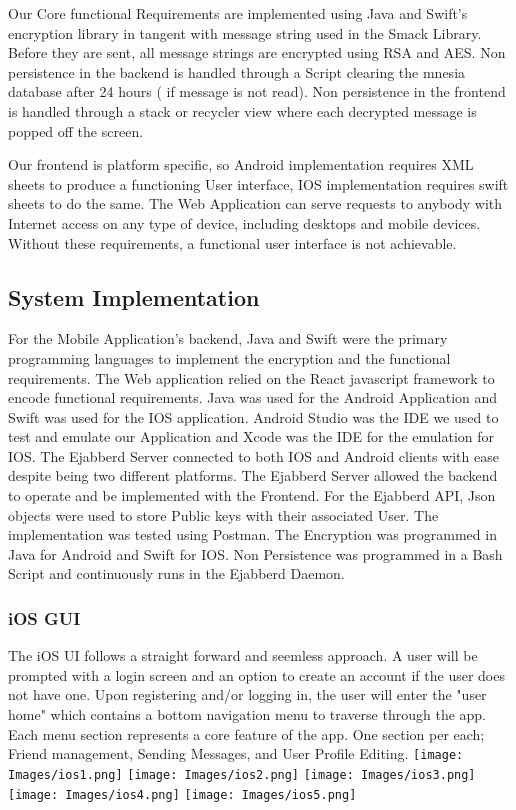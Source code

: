 \documentclass[12pt]{article}
\begin{document}
Our Core functional Requirements are implemented using Java and Swift’s encryption library in tangent with message string used in the Smack Library. Before they are sent, all message strings are encrypted using RSA and AES. Non persistence in the backend is handled through a Script clearing the mnesia database after 24 hours ( if message is not read).  Non persistence in the frontend is handled through a stack or recycler view where each decrypted message is popped off the screen.

Our frontend is platform specific, so Android implementation requires XML sheets to produce a functioning User interface, IOS implementation requires swift sheets to do the same. The Web Application can serve requests to anybody with Internet access on any type of device, including desktops and mobile devices. Without these requirements, a functional user interface is not achievable.

\RaggedRight\subsection{System Implementation}\label{chap:implementation}

For the Mobile Application’s backend, Java and Swift were the primary programming languages to implement the encryption and the functional requirements. The Web application relied on the React javascript framework to encode functional requirements. Java was used for the Android Application and Swift was used for the IOS application. Android Studio was the IDE we used to test and emulate our Application and Xcode was the IDE for the emulation for IOS. The Ejabberd Server connected to both IOS and Android clients with ease despite being two different platforms. The Ejabberd Server allowed the backend to operate and be implemented with the Frontend. For the Ejabberd API, Json objects were used to store Public keys with their associated User. The implementation was tested using Postman. The Encryption was programmed in Java for Android and Swift for IOS. Non Persistence was programmed in a Bash Script and continuously runs in the Ejabberd Daemon. 

\subsubsection{iOS GUI}
The iOS UI follows a straight forward and seemless approach. A user will be prompted with a login screen and an option to create an account if the user does not have one. Upon registering and/or logging in, the user will enter the "user home" which contains a bottom navigation menu to traverse through the app. Each menu section represents a core feature of the app. One section per each; Friend management, Sending Messages, and User Profile Editing. 
\texttt{[image: Images/ios1.png]}
\texttt{[image: Images/ios2.png]}
\texttt{[image: Images/ios3.png]}
\newline
\texttt{[image: Images/ios4.png]}
\texttt{[image: Images/ios5.png]}
\end{document}
